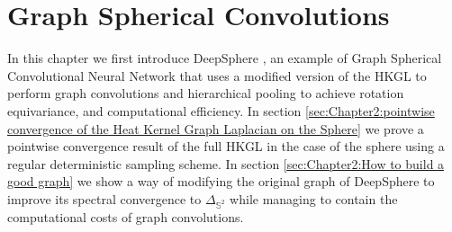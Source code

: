 

\section{Graph Spherical Convolutions}\label{sec:Graph Spherical Convolutions}
In this chapter we first introduce DeepSphere \cite{DeepSphere}, an example of Graph Spherical Convolutional Neural Network that uses a modified version of the HKGL to perform graph convolutions and hierarchical pooling to achieve rotation equivariance, and computational efficiency. In section \ref{sec:Chapter2:pointwise convergence of the Heat Kernel Graph Laplacian on the Sphere} we prove a pointwise convergence result of the full HKGL in the case of the sphere using a regular deterministic sampling scheme. In section \ref{sec:Chapter2:How to build a good graph} we show a way of modifying the original graph of DeepSphere to improve its spectral convergence to $\Delta_{\mathbb S^2}$ while managing to contain the computational costs of graph convolutions.
